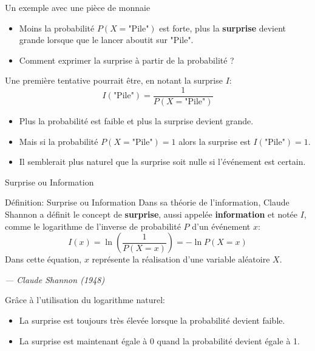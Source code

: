 \begin{frame}{Un exemple avec une pièce de monnaie}
	\begin{itemize}
		\item Moins la probabilité $P(X = \text{"Pile"})$ est forte, plus la \textbf{surprise} devient grande lorsque que le lancer aboutit sur "Pile".
		\pause
		\item Comment exprimer la surprise à partir de la probabilité ?
	\end{itemize}
	\pause
	Une première tentative pourrait être, en notant la surprise $I$:
	\begin{equation*}
		I(\text{"Pile"}) = \frac{1}{P(X = \text{"Pile"})}
	\end{equation*}
	\pause
	\begin{itemize}
		\item Plus la probabilité est faible et plus la surprise devient grande.
		\pause
		\item Mais si la probabilité $P(X = \text{"Pile"}) = 1$ alors la surprise est $I(\text{"Pile"}) = 1$.
		\pause
		\item Il semblerait plus naturel que la surprise soit nulle si l'événement est certain.
	\end{itemize}
\end{frame}

\begin{frame}{Surprise ou Information}
	\begin{block}{Définition: Surprise ou Information}
		Dans sa théorie de l'information, Claude Shannon a définit le concept de \textbf{surprise}, aussi appelée \textbf{information} et notée $I$, comme le logarithme de l'inverse de probabilité $P$ d'un événement $x$:
		\begin{equation*}
			I(x) = \ln{\left(\frac{1}{P(X = x)}\right)} = - \ln{P(X = x)}
		\end{equation*}
		Dans cette équation, $x$ représente la réalisation d'une variable aléatoire $X$.
		
		\vspace{0.3cm}
		\hfill
		\textit{--- Claude Shannon (1948)}
	\end{block}
	\pause
	Grâce à l'utilisation du logarithme naturel:
	\begin{itemize}
		\item La surprise est toujours très élevée lorsque la probabilité devient faible.
		\item La surprise est maintenant égale à 0 quand la probabilité devient égale à 1.
	\end{itemize}
\end{frame}

